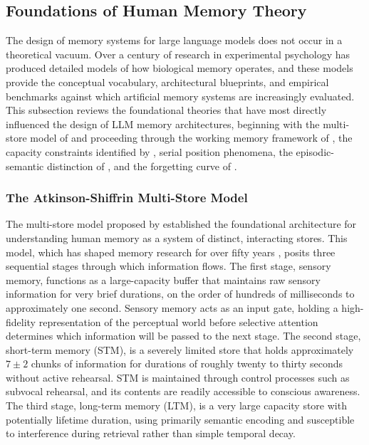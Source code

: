 \subsection{Foundations of Human Memory Theory}

The design of memory systems for large language models does not occur in a theoretical vacuum. Over a century of research in experimental psychology has produced detailed models of how biological memory operates, and these models provide the conceptual vocabulary, architectural blueprints, and empirical benchmarks against which artificial memory systems are increasingly evaluated. This subsection reviews the foundational theories that have most directly influenced the design of LLM memory architectures, beginning with the multi-store model of \citet{atkinson1968human} and proceeding through the working memory framework of \citet{baddeley1974working}, the capacity constraints identified by \citet{miller1956magical}, serial position phenomena, the episodic-semantic distinction of \citet{tulving1972episodic}, and the forgetting curve of \citet{ebbinghaus1885memory}.

\subsubsection{The Atkinson-Shiffrin Multi-Store Model}

The multi-store model proposed by \citet{atkinson1968human} established the foundational architecture for understanding human memory as a system of distinct, interacting stores. This model, which has shaped memory research for over fifty years \citep{neath2019fifty}, posits three sequential stages through which information flows. The first stage, sensory memory, functions as a large-capacity buffer that maintains raw sensory information for very brief durations, on the order of hundreds of milliseconds to approximately one second. Sensory memory acts as an input gate, holding a high-fidelity representation of the perceptual world before selective attention determines which information will be passed to the next stage. The second stage, short-term memory (STM), is a severely limited store that holds approximately $7 \pm 2$ chunks of information \citep{miller1956magical} for durations of roughly twenty to thirty seconds without active rehearsal. STM is maintained through control processes such as subvocal rehearsal, and its contents are readily accessible to conscious awareness. The third stage, long-term memory (LTM), is a very large capacity store with potentially lifetime duration, using primarily semantic encoding and susceptible to interference during retrieval rather than simple temporal decay.

